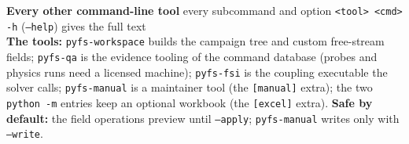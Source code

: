 \documentclass[a4paper,landscape]{article}
\newcommand{\fl}[1]{\textcolor{flag}{\texttt{#1}}}
\begin{document}
\newpage
\begin{tcolorbox}[colback=tool!8,colframe=tool,boxrule=0.4pt,left=2pt,right=2pt,top=1pt,bottom=1pt]
{\large\bfseries\color{tool} Every other command-line tool} \hfill {\small \pkgname{} \textbf{\pkgversion} \quad every subcommand and option \quad \texttt{<tool> <cmd> -h} (\texttt{--help}) gives the full text}\\[1pt]
\textbf{The tools:} \texttt{pyfs-workspace} builds the campaign tree and custom free-stream fields; \texttt{pyfs-qa} is the evidence tooling of the command database (probes and physics runs need a licensed machine); \texttt{pyfs-fsi} is the coupling executable the solver calls; \texttt{pyfs-manual} is a maintainer tool (the \texttt{[manual]} extra); the two \texttt{python -m} entries keep an optional workbook (the \texttt{[excel]} extra). \textbf{Safe by default:} the field operations preview until \fl{--apply}; \texttt{pyfs-manual} writes only with \fl{--write}.
\end{tcolorbox}
\vspace{-2pt}
\end{document}
